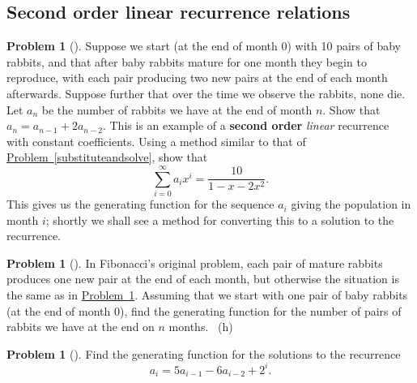 \documentclass[10pt,]{book}
\newcommand{\terminology}[1]{\textbf{#1}}
\theoremstyle{plain}
\theoremstyle{definition}
\newtheorem{activity}[project]{Problem}
\theoremstyle{definition}
\numberwithin{equation}{chapter}
\newcommand{\importantarrow}{\Rightarrow}
\begin{document}
\subsection[{Second order linear recurrence relations}]{Second order linear recurrence relations}\label{subsection-48}
\begin{activity}[] \label{secondorderintroduction}
\hypertarget{p-1236}{}%
Suppose we start (at the end of month 0) with 10 pairs of baby rabbits, and that after baby rabbits mature for one month they begin to reproduce, with each pair producing two new pairs at the end of each month afterwards. Suppose further that over the time we observe the rabbits, none die. Let \(a_n\) be the number of rabbits we have at the end of month \(n\). Show that \(a_n=a_{n-1} + 2a_{n-2}\). This is an example of a \terminology{second order} \emph{linear} recurrence with constant coefficients. Using a method similar to that of \hyperref[substituteandsolve]{Problem~\ref{substituteandsolve}}, show that%
\begin{equation*}
\sum_{i=0}^\infty a_ix^i = \frac{10}{1-x-2x^2}.
\end{equation*}
This gives us the generating function for the sequence \(a_i\) giving the population in month \(i\); shortly we shall see a method for converting this to a solution to the recurrence.%
\end{activity}
\begin{activity}[] \label{originalFibonacci}
\hypertarget{p-1238}{}%
In Fibonacci's original problem, each pair of mature rabbits produces one new pair at the end of each month, but otherwise the situation is the same as in \hyperref[secondorderintroduction]{Problem~\ref{secondorderintroduction}}.  Assuming that we start with one pair of baby rabbits (at the end of month 0), find the generating function for the number of pairs of rabbits we have at the end on \(n\) months.%
~{\tiny (h)}\end{activity}
\begin{activity}[]\marginsymbol[-1em]{\pdftooltip{$\importantarrow$}{especially interesting}} \label{secondordernonhomo}
\hypertarget{p-1241}{}%
Find the generating function for the solutions to the recurrence%
\begin{equation*}
a_i=5a_{i-1}-6a_{i-2} + 2^i.
\end{equation*}
%
\end{activity}
\end{document}
